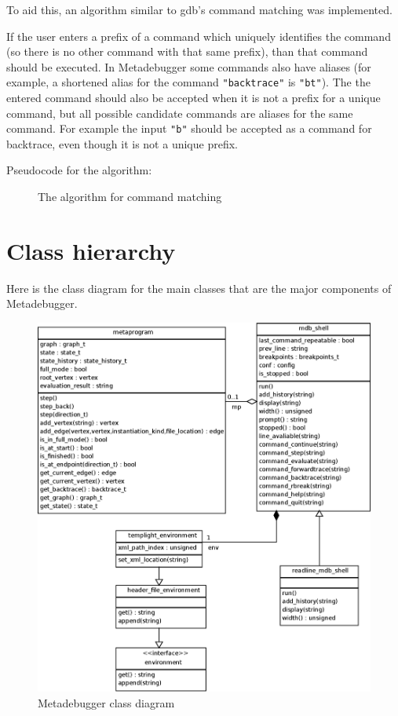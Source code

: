 To aid this, an algorithm similar to gdb's command matching was implemented.

If the user enters a prefix of a command which uniquely identifies the command
(so there is no other command with that same prefix), than that command should
be executed. In Metadebugger some commands also have aliases (for example, a
shortened alias for the command \texttt{"backtrace"} is \texttt{"bt"}). The
the entered command should also be accepted when it is not a prefix for a
unique command, but all possible candidate commands are aliases for the same
command. For example the input \texttt{"b"} should be accepted as a command
for backtrace, even though it is not a unique prefix.

Pseudocode for the algorithm:

\begin{figure}[H]
    \caption{The algorithm for command matching}
\end{figure}

\pagebreak

\section{Class hierarchy}

Here is the class diagram for the main classes that are the major components of
Metadebugger.

\begin{figure}[H]
    \centering
    \includegraphics[width=\textwidth]{img/mdb_class_diagram.eps}
    \caption{Metadebugger class diagram}
\end{figure}

